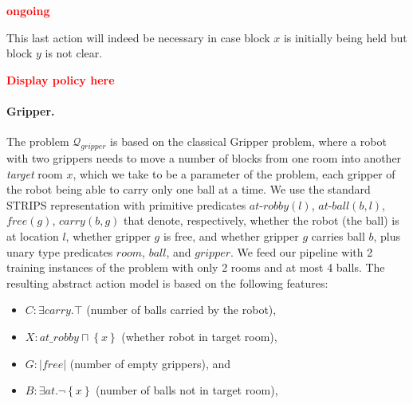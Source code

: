 \documentclass[letterpaper]{article} %
\newcommand{\set}[1]{\ensuremath{\left\{#1 \right\}}}
\newcommand{\abs}[1]{\ensuremath{\left\vert{#1}\right\vert}}
\newcommand{\alert}[1]{\textcolor{red}{\bf #1}}
\newcommand{\Q}{\mathcal{Q}}
\begin{document}
% 
% 
% 
% 
% 
% 



\alert{ongoing}

This last action will indeed be necessary in case block $x$ is initially being held
but block $y$ is not clear.

\alert{Display policy here}


\paragraph{Gripper.}
The problem $\Q_{gripper}$ is based on the classical Gripper problem, where a robot with two grippers needs to 
move a number of blocks from one room into another \emph{target} room $x$, which we take to be a parameter of the problem,
each gripper of the robot being able to carry only one ball at a time.
We use the standard STRIPS representation with primitive predicates $at\text{-}robby(l)$, $at\text{-}ball(b, l)$, $free(g)$, $carry(b, g)$ that denote,
respectively, whether the robot (the ball) is at location $l$, whether gripper $g$ is free, and whether gripper $g$ carries ball $b$,
plus unary type predicates $room$, $ball$, and $gripper$.
%
We feed our pipeline with 2 training instances of the problem with only 2 rooms and at most 4 balls.
The resulting abstract action model is based on the following features:

\begin{itemize}
\item $C: \exists carry . \top$ (number of balls carried by the robot), 
\item $X: at\_robby \sqcap \set{x}$ (whether robot in target room),
\item $G: \abs{free}$ (number of empty grippers), and
\item $B: \exists at . \neg \set{x}$ (number of balls not in target room),
\end{itemize}
\end{document}
